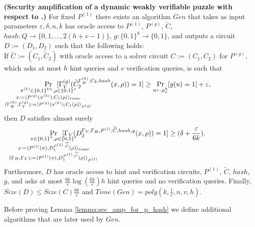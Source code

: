 %
%
\begin{lemma}\textbf{(Security amplification of a dynamic weakly verifiable puzzle with respect to .)}
  \label{lemma:sec_amp_for_p_hash}
  For fixed $P^{(1)}$ there exists an algorithm $Gen$ that takes as input parameters $\varepsilon, \delta, n, k$
  has oracle access to $P^{(1)}$, $P^{(g)}$, $\widetilde{C}$, $hash : Q \rightarrow \{0,1,\dots, 2(h+v-1)\}$, $g: \{0,1\}^{k} \rightarrow \{0,1\}$,
  and outputs a circuit $D := (D_1, D_2)$ such that the following holds: \\
  If $\widetilde{C} := (C_1, \widetilde{C}_2)$ with oracle access to a solver circuit $C := (C_1, C_2)$ for $P^{(g)}$, which asks at most $h$ hint queries
  and $v$ verification queries, is such that
  \begin{align*}
    \underset{\mathclap{\substack{
          \pi^{(k)} \in \{0,1\}^{kn}, \rho \in \{0,1\}^{*} \\
          x:= \langle P^{(g)}(\pi^{(k)}), {C}_1(\rho) \rangle_{\text{trans}} \\
          (\Gamma_H^{(k)}, \Gamma_V^{(g)}) := \langle P^{(g)}(\pi^{(k)}), C_1(\rho) \rangle_{P^{(g)}}}}}
    {\Pr}\mkern13mu[\Gamma_V^{(g)}(\widetilde{C}_2^{\Gamma_H^{(k)}, C_2, hash}(x,\rho)) = 1]
    \geq \underset{u \leftarrow \mu_\delta^k}{\Pr}[g(u) = 1] + \varepsilon,
  \end{align*}
  then $D$ satisfies almost surely
  \begin{align*}
    \underset{
      \mathclap{
      \substack{
        \pi \in \{0,1\}^{n}, \rho \in \{0,1\}^{*} \\
        x := \langle P^{(1)}(\pi), D_1^{P^{(1)}, \widetilde{C}}(\rho) \rangle_{\text{trans}} \\
        (\Gamma_H, \Gamma_V) := \langle P^{(1)}(\pi), D_1^{P^{(1)}, \widetilde{C}}(\rho) \rangle_{P^{(1)}}}}}
    {\Pr}\mkern13mu[\Gamma_V(D_2^{\Gamma_V, \Gamma_H, P^{(1)}, \widetilde{C}, hash, g}(x, \rho)) = 1] \geq (\delta + \frac{\varepsilon}{6k}).
  \end{align*}
  Furthermore, $D$ has oracle access to hint and verification circuits, $P^{(1)}$, $\widetilde{C}$, $hash$, $g$, and
  asks at most $\frac{6k}{\epsilon}\log\left(\frac{6k}{\epsilon}\right) h$ hint queries and no verification queries.
  Finally, $Size(D) \leq Size(C)\frac{6k}{\varepsilon}$ and $Time(Gen) = poly(k, \frac{1}{\varepsilon}, n, v, h)$.
\end{lemma}
%
%
Before proving Lemma \ref{lemma:sec_amp_for_p_hash} we define additional algorithms that are later used by $Gen$.
